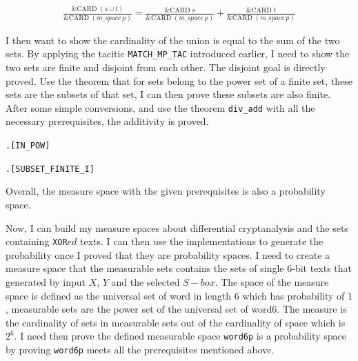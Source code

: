 \documentclass{article}
\begin{document}
\begin{multline*}
\frac{\text{\&CARD} \; (s \cup t)}{\text{\&CARD} \; (m\_space \, p)} = \frac{\text{\&CARD} \; s}{\text{\&CARD} \; (m\_space \, p)} + \frac{\text{\&CARD} \; t}{\text{\&CARD} \; (m\_space \, p)}
\end{multline*}

I then want to show the cardinality of the union is equal to the sum of the two sets. By applying the tacitic
\verb|MATCH_MP_TAC| introduced earlier, I need to show the two sets are finite and disjoint from each other. The disjoint
goal is directly proved. Use the theorem that for sets belong to the power set of a finite set, these sets are the subsets
of that set, I can then prove these subsets are also finite. After some simple conversions, and use the theorem \verb|div_add|
with all the necessary prerequisites, the additivity is proved.

\begin{alltt}
  \HOLTokenTurnstile{} \HOLSymConst{\HOLTokenForall{}} .  \HOLSymConst{\HOLTokenIn{}}   \HOLSymConst{\HOLTokenEquiv{}}  \HOLSymConst{\HOLTokenSubset{}} \hfill{[IN_POW]}
\end{alltt}

\begin{alltt}
  \HOLTokenTurnstile{} \HOLSymConst{\HOLTokenForall{}} .   \HOLSymConst{\HOLTokenConj{}}  \HOLSymConst{\HOLTokenSubset{}}  \HOLSymConst{\HOLTokenImp{}}  \hfill{[SUBSET_FINITE_I]}
\end{alltt}

Overall, the measure space with the given prerequisites is also a probability space.

Now, I can build my measure spaces about differential cryptanalysis and the sets containing \verb|XOR|$ed$ texts. I can then use
the implementations to generate the probability once I proved that they are probability spaces. I need to create a measure space
that the measurable sets contains the sets of single 6-bit texts that generated by input $X$, $Y$ and the selected $S-box$.
The space of the measure space is defined as the universal set of word in length 6 which has probability of 1 ,
measurable sets are the power set of the universal set of word6. The measure is the cardinality of sets in measurable sets
out of the cardinality of space which is $2^6$. I need then prove the defined measurable space \verb|word6p| is
a probability space by proving \verb|word6p| meets all the prerequisites mentioned above.
\end{document}
